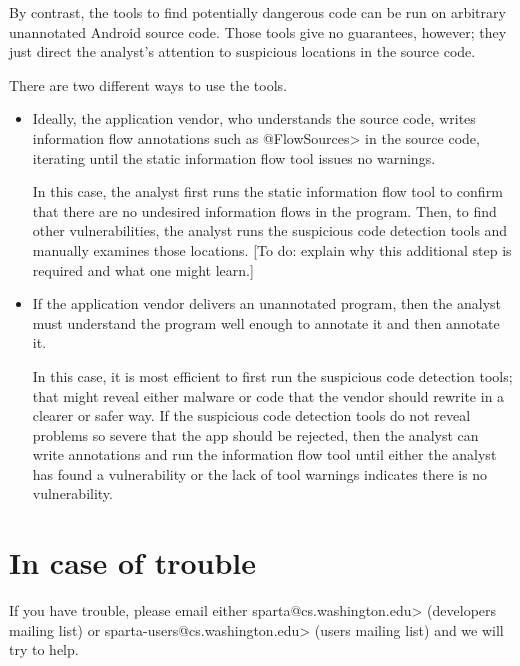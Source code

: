 By contrast, the tools to find potentially dangerous code can be run on
arbitrary unannotated Android source code.  Those tools give no guarantees,
however; they just direct the analyst's attention to suspicious locations
in the source code.


There are two different ways to use the tools.
\begin{itemize}
\item
  Ideally, the application vendor, who understands the source code,
  writes information flow annotations such as \<@FlowSources> in the source
  code, iterating until the static information flow tool issues no warnings.

  In this case, the analyst first runs the static information flow tool to
  confirm that there are no undesired information flows in the program.
  Then, to find other vulnerabilities, the analyst runs the suspicious code
  detection tools and manually examines those locations.
  [To do:  explain why this additional step is required and what one might
  learn.]

\item
  If the application vendor delivers an unannotated program, then the
  analyst must understand the program well enough to annotate it and then
  annotate it.

  In this case, it is most efficient to first run the suspicious code
  detection tools; that might reveal either malware or code that the vendor
  should rewrite in a clearer or safer way.  If the suspicious code
  detection tools do not reveal problems so severe that the app should be
  rejected, then the analyst can write annotations and run the information
  flow tool until either the analyst has found a vulnerability or the lack
  of tool warnings indicates there is no vulnerability.
\end{itemize}


\section{In case of trouble\label{sec:incaseoftrouble}}

\begin{sloppypar}
If you have trouble, please email either
\<sparta@cs.washington.edu>
(developers mailing list) or
\<sparta-users@cs.washington.edu> (users
mailing list) and we will try to help.
\end{sloppypar}





